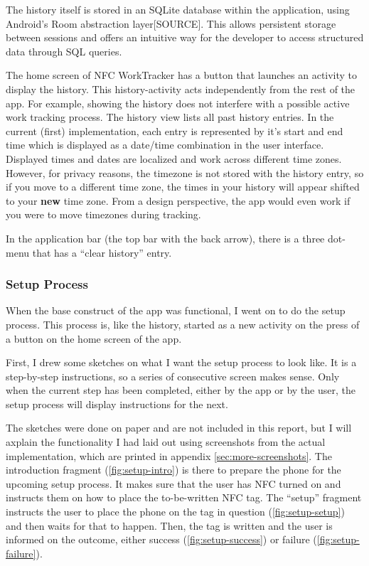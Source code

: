 \documentclass[conference]{IEEEtran}
\newcommand{\projectname}{NFC WorkTracker}
\begin{document}
The history itself is stored in an SQLite database within the application, using Android's Room abstraction layer[SOURCE]. This allows persistent storage between sessions and offers an intuitive way for the developer to access structured data through SQL queries.

The home screen of \projectname{} has a button that launches an activity to display the history. This history-activity acts independently from the rest of the app. For example, showing the history does not interfere with a possible active work tracking process. The history view lists all past history entries. In the current (first) implementation, each entry is represented by it's start and end time which is displayed as a date/time combination in the user interface. Displayed times and dates are localized and work across different time zones. However, for privacy reasons, the timezone is not stored with the history entry, so if you move to a different time zone, the times in your history will appear shifted to your \textbf{new} time zone. From a design perspective, the app would even work if you were to move timezones during tracking.

In the application bar (the top bar with the back arrow), there is a three dot-menu that has a ``clear history'' entry.

\subsubsection{Setup Process}
When the base construct of the app was functional, I went on to do the setup process. This process is, like the history, started as a new activity on the press of a button on the home screen of the app.

First, I drew some sketches on what I want the setup process to look like. It is a step-by-step instructions, so a series of consecutive screen makes sense. Only when the current step has been completed, either by the app or by the user, the setup process will display instructions for the next.

The sketches were done on paper and are not included in this report, but I will axplain the functionality I had laid out using screenshots from the actual implementation, which are printed in appendix \ref{sec:more-screenshots}.
The introduction fragment (\cref{fig:setup-intro}) is there to prepare the phone for the upcoming setup process. It makes sure that the user has NFC turned on and instructs them on how to place the to-be-written NFC tag. The ``setup'' fragment instructs the user to place the phone on the tag in question (\cref{fig:setup-setup}) and then waits for that to happen. Then, the tag is written and the user is informed on the outcome, either success (\cref{fig:setup-success}) or failure (\cref{fig:setup-failure}).
\end{document}
